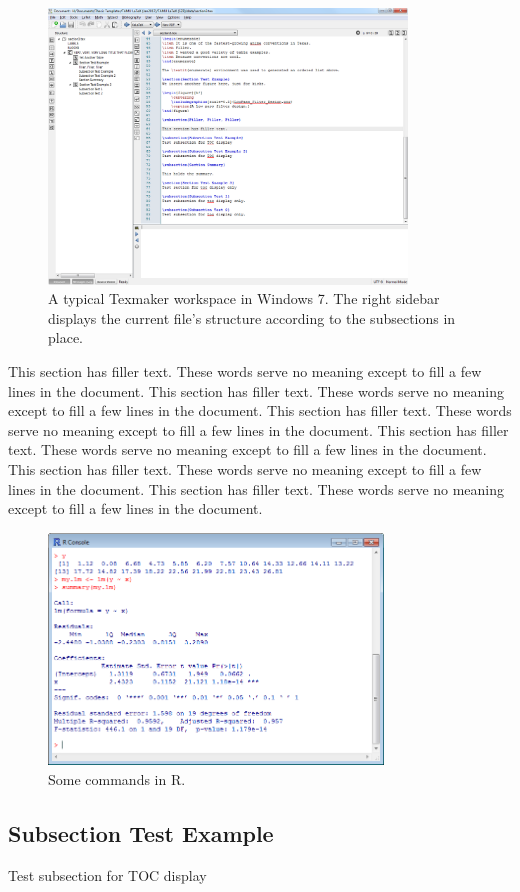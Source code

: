 \begin{figure}[h!]
	\centering
	\includegraphics[width=3.75in]{images/Workspace1.png}
	\caption{A typical Texmaker workspace in Windows 7. The right sidebar displays the current file's structure according to the subsections in place.}
\end{figure}

This section has filler text. These words serve no meaning except to fill a few lines in the document. This section has filler text. These words serve no meaning except to fill a few lines in the document. This section has filler text. These words serve no meaning except to fill a few lines in the document. This section has filler text. These words serve no meaning except to fill a few lines in the document. This section has filler text. These words serve no meaning except to fill a few lines in the document. This section has filler text. These words serve no meaning except to fill a few lines in the document.

\begin{figure}[h!]
	\centering
	\includegraphics[width=3.5in]{images/Rachl1.png}
	\caption{Some commands in R.}
\end{figure}

\subsection{Subsection Test Example}
Test subsection for TOC display

